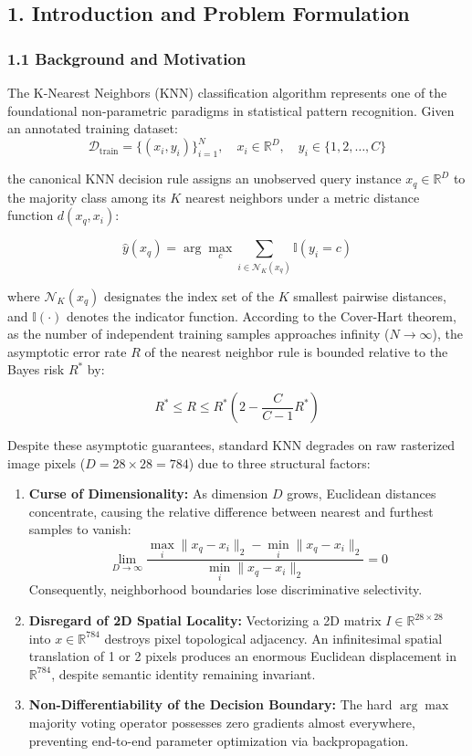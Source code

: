 \subsection{1. Introduction and Problem
Formulation}\label{1-introduction-and-problem-formulation}

\subsubsection{1.1 Background and
Motivation}\label{11-background-and-motivation}

The K-Nearest Neighbors (KNN) classification algorithm represents one of
the foundational non-parametric paradigms in statistical pattern
recognition. Given an annotated training dataset:
\[\mathcal{D}_{\text{train}} = \{ (x_i, y_i) \}_{i=1}^{N}, \quad x_i \in \mathbb{R}^D, \quad y_i \in \{ 1, 2, \dots, C \}\]

the canonical KNN decision rule assigns an unobserved query instance
\(x_q \in \mathbb{R}^D\) to the majority class among its \(K\) nearest
neighbors under a metric distance function \(d(x_q, x_i)\):

\[\hat{y}(x_q) = \arg\max_{c} \sum_{i \in \mathcal{N}_K(x_q)} \mathbb{I}(y_i = c)\]

where \(\mathcal{N}_K(x_q)\) designates the index set of the \(K\)
smallest pairwise distances, and \(\mathbb{I}(\cdot)\) denotes the
indicator function. According to the Cover-Hart theorem, as the number
of independent training samples approaches infinity (\(N \to \infty\)),
the asymptotic error rate \(R\) of the nearest neighbor rule is bounded
relative to the Bayes risk \(R^*\) by:

\[R^* \le R \le R^* \left( 2 - \frac{C}{C-1} R^* \right)\]

Despite these asymptotic guarantees, standard KNN degrades on raw
rasterized image pixels (\(D = 28 \times 28 = 784\)) due to three
structural factors:

\begin{enumerate}
\def\labelenumi{\arabic{enumi}.}
\tightlist
\item
  \textbf{Curse of Dimensionality:} As dimension \(D\) grows, Euclidean
  distances concentrate, causing the relative difference between nearest
  and furthest samples to vanish:
  \[\lim_{D \to \infty} \frac{\max_i \|x_q - x_i\|_2 - \min_i \|x_q - x_i\|_2}{\min_i \|x_q - x_i\|_2} = 0\]
  Consequently, neighborhood boundaries lose discriminative selectivity.
\item
  \textbf{Disregard of 2D Spatial Locality:} Vectorizing a 2D matrix
  \(I \in \mathbb{R}^{28 \times 28}\) into \(x \in \mathbb{R}^{784}\)
  destroys pixel topological adjacency. An infinitesimal spatial
  translation of 1 or 2 pixels produces an enormous Euclidean
  displacement in \(\mathbb{R}^{784}\), despite semantic identity
  remaining invariant.
\item
  \textbf{Non-Differentiability of the Decision Boundary:} The hard
  \(\arg\max\) majority voting operator possesses zero gradients almost
  everywhere, preventing end-to-end parameter optimization via
  backpropagation.
\end{enumerate}

